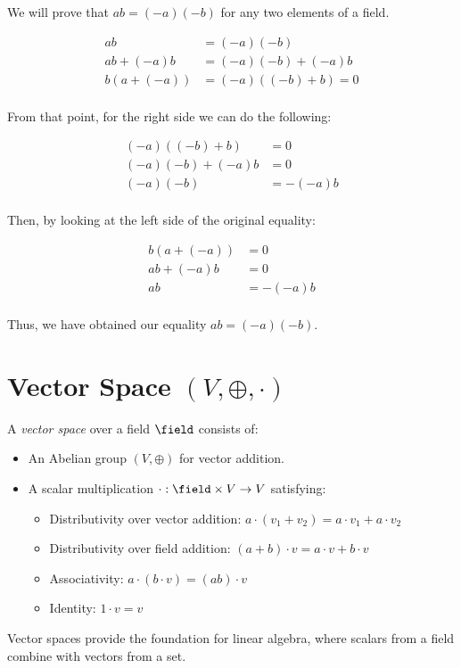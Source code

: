We will prove that \(ab = (-a)(-b)\) for any two elements of a field.

\begin{align*}
	ab &= (-a)(-b) \\
	ab + (-a)b &= (-a)(-b) + (-a)b \\ 
	b(a + (-a)) &= (-a)((-b) + b) = 0\\
\end{align*}

From that point, for the right side we can do the following:

\begin{align*}
	(-a)((-b) + b) &= 0\\
	(-a)(-b) + (-a)b &= 0\\
	(-a)(-b) &= -(-a)b\\
\end{align*}

Then, by looking at the left side of the original equality:

\begin{align*}
	b(a + (-a)) &= 0\\
	ab + (-a)b &= 0\\
	ab &= -(-a)b\\
\end{align*}

Thus, we have obtained our equality \(ab = (-a)(-b)\).

\QED

\section{Vector Space \texorpdfstring{\((V, \oplus, \cdot)\)}{}}

A \emph{vector space} over a field \(\field\) consists of:

\begin{itemize}

    \item An Abelian group \((V, \oplus)\) for vector addition.

    \item A scalar multiplication \(\cdot: \field \times V \to V\) satisfying:

    \begin{itemize}

        \item Distributivity over vector addition: \(a \cdot (v_1 + v_2) = a \cdot v_1 + a \cdot v_2\)
    
        \item Distributivity over field addition: \((a + b) \cdot v = a \cdot v + b \cdot v\)

        \item Associativity: \(a \cdot (b \cdot v) = (ab) \cdot v\)
    
        \item Identity: \(1 \cdot v = v\)

  \end{itemize}

\end{itemize}

Vector spaces provide the foundation for linear algebra, where scalars from a field combine with vectors from a set.

